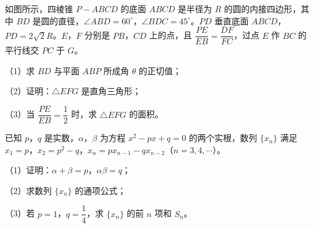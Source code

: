 \begingroup
\renewenvironment{question}{\Needspace{0.5\textheight}}{}
\begin{question}
如图所示，四棱锥 $P-ABCD$ 的底面 $ABCD$ 是半径为 $R$ 的圆的内接四边形，其中 $BD$ 是圆的直径，$\angle ABD=60^\circ$，$\angle BDC=45^\circ$。$PD$ 垂直底面 $ABCD$，$PD=2\sqrt2R$。$E$，$F$ 分别是 $PB$，$CD$ 上的点，且 $\dfrac{PE}{EB}=\dfrac{DF}{FC}$，过点 $E$ 作 $BC$ 的平行线交 $PC$ 于 $G$。

（1）求 $BD$ 与平面 $ABP$ 所成角 $\theta$ 的正切值；

（2）证明：$\triangle EFG$ 是直角三角形；

（3）当 $\dfrac{PE}{EB}=\dfrac12$ 时，求 $\triangle EFG$ 的面积。
\nopagebreak[4]
\begin{center}\end{center}
\nopagebreak[4]
\end{question}
\endgroup
\begin{question}
已知 $p$，$q$ 是实数，$\alpha$，$\beta$ 为方程 $x^2-px+q=0$ 的两个实根，数列 $\{x_n\}$ 满足 $x_1=p$，$x_2=p^2-q$，$x_n=px_{n-1}-qx_{n-2}$（$n=3,4,\cdots$）。

（1）证明：$\alpha+\beta=p$，$\alpha\beta=q$；

（2）求数列 $\{x_n\}$ 的通项公式；

（3）若 $p=1$，$q=\dfrac14$，求 $\{x_n\}$ 的前 $n$ 项和 $S_n$。

\end{question}